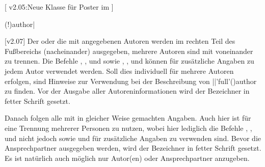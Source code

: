 \begin{DeclareEntity}{}[%
  v2.05:Neue Klasse für Poster im \TUDCD%
]
\begin{Declaration}
  {\Macro(!){author|}}
\begin{Declaration}
  {}
\begin{Declaration}
  {}
\begin{Declaration}
  {}
\begin{Declaration}
  {}
\begin{Declaration}
  {}
\begin{Declaration}
  {}
\begin{Declaration}
  {}
\begin{Declaration}
  {}
\begin{Declaration}
  {}
\printdeclarationlist
%
[v2.07]
Der oder die mit  angegebenen Autoren werden im rechten Teil des 
Fußbereichs (nacheinander) ausgegeben, mehrere Autoren sind mit  
voneinander zu trennen. Die Befehle , , 
 und  sowie , , 
und  können für zusätzliche Angaben zu jedem Autor verwendet 
werden. Soll dies individuell für mehrere Autoren erfolgen, sind Hinweise zur 
Verwendung bei der Beschreibung von \Macro||'full'(){author} zu 
finden. Vor der Ausgabe aller Autoreninformationen wird der Bezeichner 
 in fetter Schrift gesetzt. 

Danach folgen alle mit  in gleicher Weise gemachten 
Angaben. Auch hier ist  für eine Trennung mehrerer Personen zu 
nutzen, wobei hier lediglich die Befehle , , 
 und  nicht jedoch  sowie 
 und  für zusätzliche Angaben zu verwenden 
sind. Bevor die Ansprechpartner ausgegeben werden, wird der Bezeichner 
 in fetter Schrift gesetzt. Es ist natürlich auch 
möglich nur Autor(en) oder Ansprechpartner anzugeben.
\end{Declaration}
\end{Declaration}
\end{Declaration}
\end{Declaration}
\end{Declaration}
\end{Declaration}
\end{Declaration}
\end{Declaration}
\end{Declaration}
\end{Declaration}


\end{DeclareEntity}
